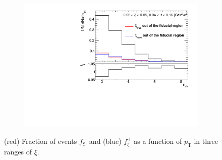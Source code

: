 \begin{figure}[h!]
\begin{subfigure}{.49\textwidth}
		\includegraphics[width=\textwidth,page=6]{chapters/chrgSTAR/img/xiMigration/xi.pdf}
	\end{subfigure}
	\begin{minipage}{.49\textwidth}
		\caption{(red) Fraction of events $f_{\xi}^-$ and (blue) $f_{\xi}^+$  as a function of $p_\textrm{T}$ in three ranges of $\xi$.}
		\label{fig:xi_correction_pt}
	\end{minipage}
\end{figure}

